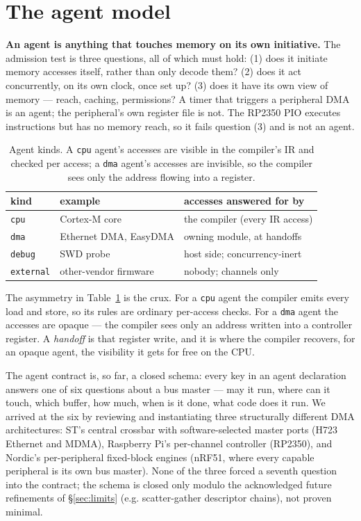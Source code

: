 \documentclass[10pt,twocolumn]{article}
\begin{document}
\section{The agent model}
\label{sec:agents}

\textbf{An agent is anything that touches memory on its own initiative.} The
admission test is three questions, all of which must hold: (1) does it initiate
memory accesses itself, rather than only decode them? (2) does it act
concurrently, on its own clock, once set up? (3) does it have its own view of
memory --- reach, caching, permissions? A timer that triggers a peripheral DMA
is an agent; the peripheral's own register file is not. The RP2350 PIO executes
instructions but has no memory reach, so it fails question (3) and is not an
agent.

\begin{table}[t]
\centering
\footnotesize
\begin{tabular}{@{}lll@{}}
\toprule
kind & example & accesses answered for by \\
\midrule
\texttt{cpu}      & Cortex-M core           & the compiler (every IR access) \\
\texttt{dma}      & Ethernet DMA, EasyDMA   & owning module, at handoffs \\
\texttt{debug}    & SWD probe               & host side; concurrency-inert \\
\texttt{external} & other-vendor firmware   & nobody; channels only \\
\bottomrule
\end{tabular}
\caption{Agent kinds. A \texttt{cpu} agent's accesses are visible in the
compiler's IR and checked per access; a \texttt{dma} agent's accesses are
invisible, so the compiler sees only the address flowing into a register.}
\label{tab:agents}
\end{table}

The asymmetry in Table~\ref{tab:agents} is the crux. For a \texttt{cpu} agent
the compiler emits every load and store, so its rules are ordinary per-access
checks. For a \texttt{dma} agent the accesses are opaque --- the compiler sees
only an address written into a controller register. A \emph{handoff} is that
register write, and it is where the compiler recovers, for an opaque agent, the
visibility it gets for free on the CPU.

The agent contract is, so far, a closed schema: every key in an agent declaration
answers one of six questions about a bus master --- may it run, where can it
touch, which buffer, how much, when is it done, what code does it run. We arrived at the six
by reviewing and instantiating three structurally different DMA architectures:
ST's central crossbar with software-selected master ports (H723 Ethernet and
MDMA), Raspberry Pi's per-channel controller (RP2350), and Nordic's
per-peripheral fixed-block engines (nRF51, where every capable peripheral is its
own bus master). None of the three forced a seventh question into the contract; the
schema is closed only modulo the acknowledged future refinements of \S\ref{sec:limits}
(e.g. scatter-gather descriptor chains), not proven minimal.
\end{document}
